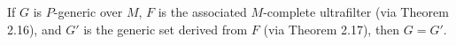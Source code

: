 If $G$ is $P$-generic over $M$, $F$ is the associated $M$-complete ultrafilter (via Theorem 2.16), and $G'$ is the generic set derived from $F$ (via Theorem 2.17), then $G = G'$.
